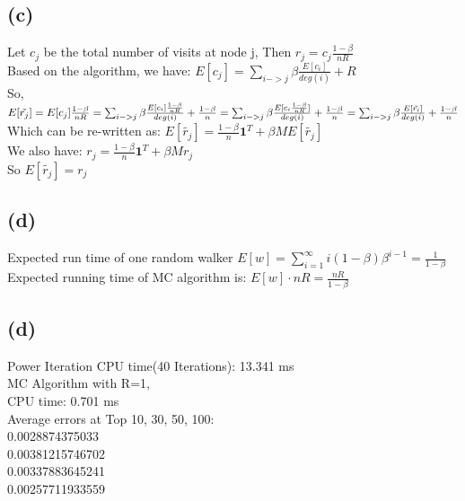 \documentclass{article}
\begin{document}
\subsection{(c)}
Let $c_j$ be the total number of visits at node j, Then $r_j = c_j\frac{1-\beta}{nR}$\\
Based on the algorithm, we have: $E[c_j] = \sum_{i->j} \beta \frac{E[c_i]}{deg(i)} + R$ \\
So, $E[\tilde{r_j}] = E[c_j]\frac{1-\beta}{nR} = \sum_{i->j} \beta \frac{E[c_i]\frac{1-\beta}{nR}}{deg(i)} + \frac{1-\beta}{n} \\
= \sum_{i->j} \beta \frac{E[c_i\frac{1-\beta}{nR}]}{deg(i)} + \frac{1-\beta}{n} \\
= \sum_{i->j} \beta \frac{E[\tilde{r_i}]}{deg(i)} + \frac{1-\beta}{n}$ \\
Which can be re-written as: $E[\tilde{r_j}] = \frac{1-\beta}{n}\textbf{1}^T + \beta ME[\tilde{r_j}]$ \\
We also have: $r_j = \frac{1-\beta}{n}\textbf{1}^T + \beta Mr_j$ \\
So $E[\tilde{r_j}] = r_j$


\subsection{(d)}
Expected run time of one random walker $E[w] = \sum_{i=1}^{\infty}i(1-\beta)\beta^{i-1}=\frac{1}{1-\beta}$\\
Expected running time of MC algorithm is: $E[w]\cdot nR = \frac{nR}{1-\beta}$

\subsection{(d)}
Power Iteration CPU time(40 Iterations): 13.341 ms\\
MC Algorithm with R=1, \\
\indent CPU time: 0.701 ms\\
\indent Average errors at Top 10, 30, 50, 100:\\
0.0028874375033 \\
0.00381215746702\\
0.00337883645241\\
0.00257711933559\\
\end{document}
